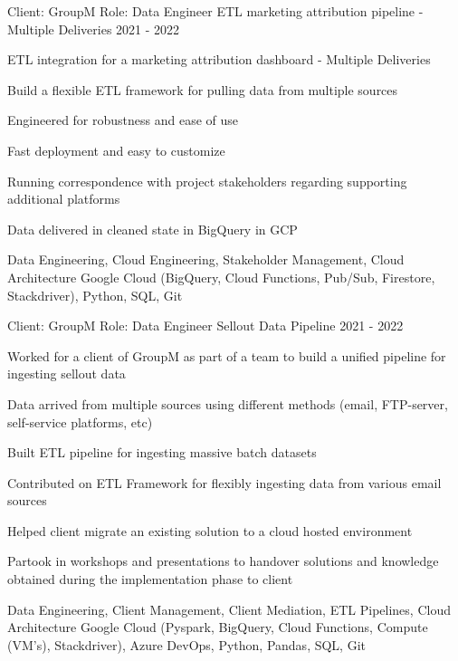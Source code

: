 \begin{cventries}
\cventry
{Client: GroupM \newline Role: Data Engineer} %
{ETL marketing attribution pipeline - Multiple Deliveries} %
{}%
{2021 - 2022} %
{ %
\begin{cvitems}
    \item {ETL integration for a marketing attribution dashboard - Multiple Deliveries}
    \item {Build a flexible ETL framework for pulling data from multiple sources}
    \item {Engineered for robustness and ease of use}
    \item {Fast deployment and easy to customize}
    \item {Running correspondence with project stakeholders regarding supporting additional platforms}
    \item {Data delivered in cleaned state in BigQuery in GCP }
\end{cvitems}
\cventrykeywords
{Data Engineering, Cloud Engineering, Stakeholder Management, Cloud Architecture}
{Google Cloud (BigQuery, Cloud Functions, Pub/Sub, Firestore, Stackdriver), Python, SQL, Git}
}

\cventry
{Client: GroupM \newline Role: Data Engineer} %
{Sellout Data Pipeline} %
{}%
{2021 - 2022} %
{ %
\begin{cvitems}
    \item {Worked for a client of GroupM as part of a team to build a unified pipeline for ingesting sellout data}
    \item {Data arrived from multiple sources using different methods (email, FTP-server, self-service platforms, etc)}
    \item {Built ETL pipeline for ingesting massive batch datasets}
    \item {Contributed on ETL Framework for flexibly ingesting data from various email sources}
    \item {Helped client migrate an existing solution to a cloud hosted environment}
    \item {Partook in workshops and presentations to handover solutions and knowledge obtained during the implementation phase to client}
\end{cvitems}
\cventrykeywords
{Data Engineering, Client Management, Client Mediation, ETL Pipelines, Cloud Architecture}
{Google Cloud (Pyspark, BigQuery, Cloud Functions, Compute (VM’s), Stackdriver), Azure DevOps, Python, Pandas, SQL, Git}
}


\end{cventries}
